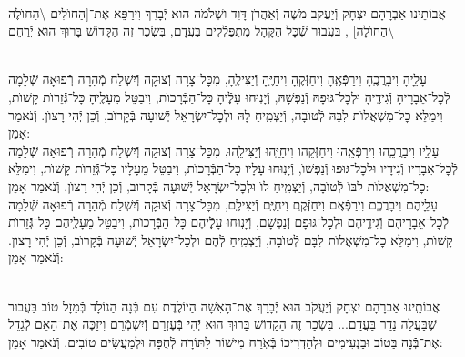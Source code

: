 \documentclass[twoside, openany, parskip=half, 11pt]{book}
\begin{document}
\begin{small}

\\
אֲבוֹתֵינוּ אַבְרָהָם יִצְחָק וְֿיַעֲקֹב מֹשֶׁה וְֿאַהֲרֹן דָּוִד וּשְׁלֹמֹה הוּא יְֿבָרֵךְ וִירַפֵּא אֶת־[הַחוׂלִים \textbackslash הַחוׂלֶה \textbackslash הַחוׂלָה]
,
בּעֲבוּר שְֿׁכָּל הַקָּהָל מִתְפַּלְֿלִים בַּעֲדָם, בִּשְׂכַר זֶה
הַקָּדוֹשׁ בָּרוּךְ הוּא יְֿרַחֵם
\setcolumnwidth{1.4in,1.4in,1.4in}
\begin{paracol}{3}
\\
עָלֵָיהָ וִיבָרֲכֶֽהָ וִירַפְּֿאֶֽהָ וִיחַזְּֿקֶֽהָ וִיחַיֶּֽהָ וְֿיַצִּילֶֽהָ, מִכׇּל־צָרָה וְֿצוּקָה וְֿיִשְׁלַח מְֿהֵרָה רְֿפוּאָה שְֿׁלֵמָה לְֿכׇל־אֵבָרָיהָ וְֿגִידֶֽיהָ וּלְכׇל־גּוּפָהּ וְֿנַפְשָׁהּ, וְֿיָנֽוּחוּ עָלְֶֿיהָ כָּל־הַבְּֿרָכוׂת, וִיבַטֵּל מֵעָלֶֽיהָ כָּל־גְּֿֿזֵרוׂת קָשׁוׂת, וִימַלֵּא כׇל־מִשְׁאֲלוׂת לִבָּהּ לְֿטוׂבָה, וְֿיַצְמִֽיחַ לָהּ וּלְכׇל־יִשְׂרָאֵל יְֿשׁוּעָה בְּֿקָרוׂב, וְֿכֵן יְֿהִי רָצוׂן. וְֿנֹאמַר אָמֵן:
\switchcolumn
{}\\
עָלֵָיו וִיבָרֲכֵֽהוּ וִירַפְּֿאֵֽהוּ וִיחַזְּֿקֵהוּ וִיחַיֵּֽהוּ וְֿיַצִּילֵֽהוּ, מִכׇּל־צָרָה וְֿצוּקָה וְֿיִשְׁלַח מְֿהֵרָה רְֿפוּאָה שְֿׁלֵמָה לְֿכׇל־אֵבָרָיו וְֿגִידָיו וּלְכׇל־גּוּפוּ וְֿנַפְשׁוׂ, וְֿיָנֽוּחוּ עָלָיו כָּל־הַבְּֿרָכוׂת, וִיבַטֵּל מֵעָלָיו כָּל־גְּֿֿזֵרוׂת קָשׁוׂת, וִימַלֵּא כׇל־מִשְׁאֲלוׂת לִבּוׂ לְֿטוׂבָה, וְֿיַצְמִֽיחַ לוׂ וּלְכׇל־יִשְׂרָאֵל יְֿשׁוּעָה בְּֿקָרוׂב, וְֿכֵן יְֿהִי רָצוׂן. וְֿנֹאמַר אָמֵן:
\switchcolumn
{}\\
עָלֵָיהֶם וִיבָרֲכְֶם וִירַפְּֿאֶֽם וִיחַזְּֿקֶֽם וִיחַיֶּֽם וְֿיַצִּילֶֽם, מִכׇּל־צָרָה וְֿצוּקָה וְֿיִשְׁלַח מְֿהֵרָה רְֿפוּאָה שְֿׁלֵמָה לְֿכׇל־אֵבָרָיהֶם וְֿגִידֶֽיהֶם וּלְכׇל־גּוּפָם וְֿנַפְשָׁם, וְֿיָנֽוּחוּ עָלְֶֿיהֶם כָּל־הַבְּֿרָכוׂת, וִיבַטֵּל מֵעָלֶֽיהֶם כָּל־גְּֿֿזֵרוׂת קָשׁוׂת, וִימַלֵּא כׇל־מִשְׁאֲלוׂת לִבָּם לְֿטוׂבָה, וְֿיַצְמִֽיחַ לְֿהֶם וּלְכׇל־יִשְׂרָאֵל יְֿשׁוּעָה בְּֿקָרוׂב, וְֿכֵן יְֿהִי רָצוׂן. וְֿנֹאמַר אָמֵן:
\end{paracol}

\vspace{\baselineskip}

\\
אֲבוֹתֵֽינוּ אַבְרָהָם יִצְחָק וְֿיַעֲקֹב הוּא יְֿבָרֵךְ אֶת־הָאִשָׁה הַיוֹלֶֽדֶת
עִם בְּֿנָה הַנוֹלָד בְּֿמַזָל טוֹב בַּעֲבוּר שֶׁבַּעֲלָה נָדַר בַּעֲדָם... בִּשְׂכַר זֶה הַקָדוֹשׁ בָּרוּךְ הוּא יְֿהִי בְּֿעֶזְרָם וְֿיִשְׁמְֿרֵם וִיזַכֶּה אֶת־הָאֵם לְֿגַדֵל אֶת־בְּֿֿנָה בַּטוֹב וּבַנְעִימִים וּלְהַדְרִיכוֹ בְּֿאֹֽרַח מִישׁוֹר לַתּוֹרָה לְֿחֻפָּה וּלְמַעֲשִׂים טוֹבִים. וְֿנֹאמַר אָמֵן:


\end{small}
\end{document}
